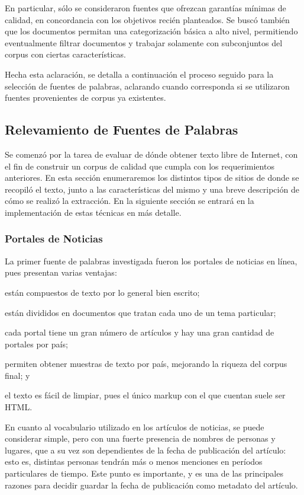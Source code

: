 En particular, sólo se consideraron fuentes que ofrezcan garantías mínimas de calidad, en concordancia
con los objetivos recién planteados. Se buscó también que los documentos permitan una categorización
básica a alto nivel, permitiendo eventualmente filtrar documentos y trabajar solamente con subconjuntos
del corpus con ciertas características.

Hecha esta aclaración, se detalla a continuación el proceso seguido para la selección de fuentes de
palabras, aclarando cuando corresponda si se utilizaron fuentes provenientes de corpus ya existentes.


\subsection{Relevamiento de Fuentes de Palabras}

Se comenzó por la tarea de evaluar de dónde obtener texto libre de Internet, con el fin de construir
un corpus de calidad que cumpla con los requerimientos anteriores. En esta sección enumeraremos los
distintos tipos de sitios de donde se recopiló el texto, junto a las características del mismo y una
breve descripción de cómo se realizó la extracción. En la siguiente sección se entrará en la
implementación de estas técnicas en más detalle.


\subsubsection{Portales de Noticias}

La primer fuente de palabras investigada fueron los portales de noticias en línea, pues presentan
varias ventajas:\begin{inparaenum}[(a)]
\item están compuestos de texto por lo general bien escrito;
\item están divididos en documentos que tratan cada uno de un tema particular;
\item cada portal tiene un gran número de artículos y hay una gran cantidad de portales por país;
\item permiten obtener muestras de texto por país, mejorando la riqueza del corpus final; y
\item el texto es fácil de limpiar, pues el único markup con el que cuentan suele ser HTML\@.
\end{inparaenum}

En cuanto al vocabulario utilizado en los artículos de noticias, se puede considerar simple, pero
con una fuerte presencia de nombres de personas y lugares, que a su vez son dependientes de la fecha
de publicación del artículo: esto es, distintas personas tendrán más o menos menciones en períodos
particulares de tiempo. Este punto es importante, y es una de las principales razones para decidir
guardar la fecha de publicación como metadato del artículo.

